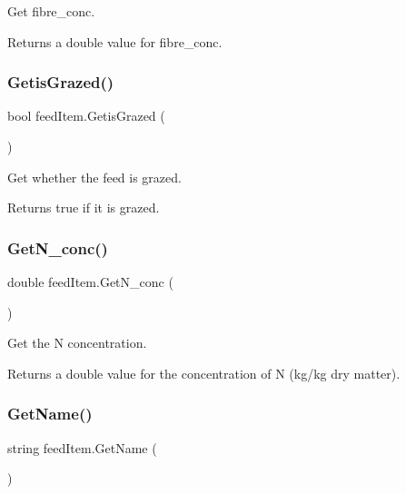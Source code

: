 Get fibre\+\_\+conc. 

\begin{DoxyReturn}{Returns}
a double value for fibre\+\_\+conc. 
\end{DoxyReturn}
\mbox{\label{classfeed_item_a6e07dda15c41ded136ba5f52ccb263a6}} 
\subsubsection{\texorpdfstring{GetisGrazed()}{GetisGrazed()}}
{\footnotesize\ttfamily bool feed\+Item.\+Getis\+Grazed (\begin{DoxyParamCaption}{ }\end{DoxyParamCaption})\hspace{0.3cm}{\ttfamily [inline]}}



Get whether the feed is grazed. 

\begin{DoxyReturn}{Returns}
true if it is grazed. 
\end{DoxyReturn}
\mbox{\label{classfeed_item_ab292a740b8d19616f849e2aaa33f4884}} 
\subsubsection{\texorpdfstring{GetN\_conc()}{GetN\_conc()}}
{\footnotesize\ttfamily double feed\+Item.\+Get\+N\+\_\+conc (\begin{DoxyParamCaption}{ }\end{DoxyParamCaption})\hspace{0.3cm}{\ttfamily [inline]}}



Get the N concentration. 

\begin{DoxyReturn}{Returns}
a double value for the concentration of N (kg/kg dry matter). 
\end{DoxyReturn}
\mbox{\label{classfeed_item_a16577e5c3903fae1efc1449bbe7e33b9}} 
\subsubsection{\texorpdfstring{GetName()}{GetName()}}
{\footnotesize\ttfamily string feed\+Item.\+Get\+Name (\begin{DoxyParamCaption}{ }\end{DoxyParamCaption})\hspace{0.3cm}{\ttfamily [inline]}}



